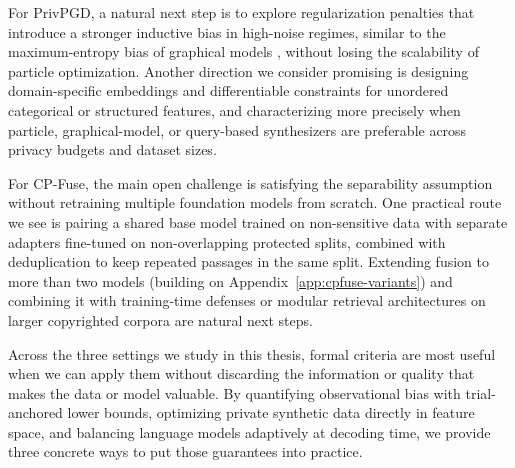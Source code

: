 For PrivPGD, a natural next step is to explore regularization penalties that introduce a stronger inductive bias in high-noise regimes, similar to the maximum-entropy bias of graphical models \citep{mckenna2019graphical}, without losing the scalability of particle optimization. Another direction we consider promising is designing domain-specific embeddings and differentiable constraints for unordered categorical or structured features, and characterizing more precisely when particle, graphical-model, or query-based synthesizers are preferable across privacy budgets and dataset sizes.

For CP-Fuse, the main open challenge is satisfying the separability assumption without retraining multiple foundation models from scratch. One practical route we see is pairing a shared base model trained on non-sensitive data with separate adapters fine-tuned on non-overlapping protected splits, combined with deduplication to keep repeated passages in the same split. Extending fusion to more than two models (building on Appendix~\ref{app:cpfuse-variants}) and combining it with training-time defenses \citep{hans2024like} or modular retrieval architectures \citep{min2023silo,golatkar2024cpr} on larger copyrighted corpora are natural next steps.

Across the three settings we study in this thesis, formal criteria are most useful when we can apply them without discarding the information or quality that makes the data or model valuable. By quantifying observational bias with trial-anchored lower bounds, optimizing private synthetic data directly in feature space, and balancing language models adaptively at decoding time, we provide three concrete ways to put those guarantees into practice.
